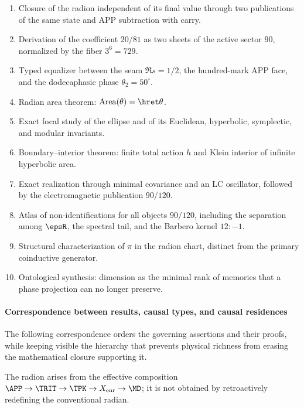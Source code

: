 \begin{enumerate}[label=\textbf{C\arabic*.}]
\item Closure of the radion independent of its final value through two publications of the same state and
APP subtraction with carry.
\item Derivation of the coefficient \(20/81\) as two sheets of the active sector
\(90\), normalized by the fiber \(3^6=729\).
\item Typed equalizer between the seam \(\Re s=1/2\), the hundred-mark APP
face, and the dodecaphasic phase \(\theta_2=50^\circ\).
\item Radian area theorem: \(\operatorname{Area}(\theta)=\hret\theta\).
\item Exact focal study of the ellipse and of its Euclidean,
hyperbolic, symplectic, and modular invariants.
\item Boundary--interior theorem: finite total action \(h\) and Klein interior
of infinite hyperbolic area.
\item Exact realization through minimal covariance and an LC oscillator, followed by
the electromagnetic publication \(90/120\).
\item Atlas of non-identifications for all objects \(90/120\), including
the separation among \(\epsR\), the spectral tail, and the Barbero kernel \(12:-1\).
\item Structural characterization of \(\pi\) in the radion chart, distinct
from the primary coinductive generator.
\item Ontological synthesis: dimension as the minimal rank of memories that a
phase projection can no longer preserve.
\end{enumerate}
\paragraph{Correspondence between results, causal types, and causal residences}

The following correspondence orders the governing assertions and their proofs,
while keeping visible the hierarchy that prevents
physical richness from erasing the mathematical closure supporting it.

\begin{exactbox}[title={APP--TRIT--TPK genealogy of the radion}]
The radion arises from the effective composition
\(\APP\to\TRIT\to\TPK\to X_{\mathrm{enr}}\to\MD\); it is not obtained
by retroactively redefining the conventional radian.
\end{exactbox}

